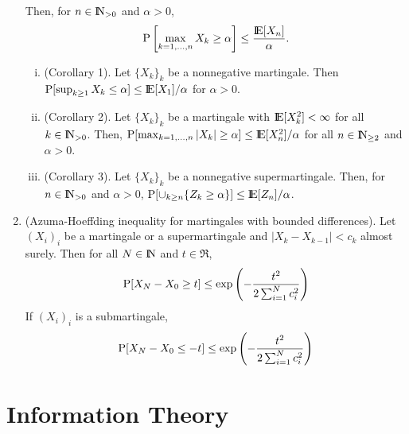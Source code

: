 \documentclass[a4paper,10pt]{article}
\begin{document}
\begin{enumerate}
       Then, for $n\in\N_{>0}$ and $\alpha>0$,
       \[
        \prob\left[ \max_{k=1,\ldots, n}X_k \geq \alpha\right] \leq \frac{\E[X_n]}{\alpha}.
       \]
       \begin{enumerate}[i.]
        \item (Corollary 1). Let $\{X_k\}_k$ be a nonnegative martingale. 
              Then $\prob[\sup_{k\geq 1}X_k \leq \alpha]\leq\E[X_1]/\alpha$ for $\alpha>0$.
        \item (Corollary 2). Let $\{X_k\}_k$ be a martingale with $\E[X_k^2]< \infty$ for all $k\in\N_{>0}$. 
               Then, $\prob[\max_{k=1,\ldots, n}|X_k|\geq \alpha]\leq \E[X_n^2]/\alpha$ for all $n\in \N_{\geq 2}$
               and $\alpha>0$.
        \item (Corollary 3). Let $\{X_k\}_k$ be a nonnegative supermartingale. Then, for $n\in\N_{>0}$
              and $\alpha>0$, $\prob[\cup_{k\geq n}\{Z_k\geq \alpha\}]\leq\E[Z_n]/\alpha$.
       \end{enumerate}


 \item (Azuma-Hoeffding inequality for martingales with bounded differences). Let $(X_i)_i$
       be a martingale or a  supermartingale and $|X_k-X_{k-1}|<c_{k}$ almost surely. Then for all $N\in\N$
       and $t\in\Re$,
       \[
        \mathrm{P}[X_N-X_0\geq t] \leq \exp \left(-\frac{t^2}{2\sum_{i=1}^{N}c_i^2}\right)
       \]
       If $(X_i)_i$ is a submartingale, 
       \[
        \mathrm{P}[X_N-X_0\leq -t] \leq \exp \left(-\frac{t^2}{2\sum_{i=1}^{N}c_i^2}\right)
       \]

\end{enumerate}



\section{Information Theory}
\end{document}
